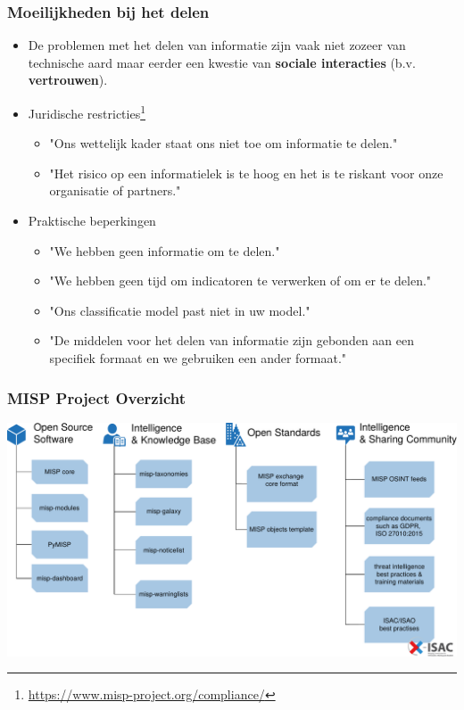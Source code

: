 \begin{frame}
\frametitle{Moeilijkheden bij het delen}
        \begin{itemize}
                \item De problemen met het delen van informatie zijn vaak niet zozeer van technische aard maar eerder een kwestie van {\bf sociale interacties} (b.v. {\bf vertrouwen}).
                \item Juridische restricties\footnote{\url{https://www.misp-project.org/compliance/}}
                        \begin{itemize}
                                \item "Ons wettelijk kader staat ons niet toe om informatie te delen."
                                \item "Het risico op een informatielek is te hoog en het is te riskant voor onze organisatie of partners."
                        \end{itemize}
                \item Praktische beperkingen
                        \begin{itemize}
                                \item "We hebben geen informatie om te delen."
                                \item "We hebben geen tijd om indicatoren te verwerken of om er te delen."
                                \item "Ons classificatie model past niet in uw model."
                                \item "De middelen voor het delen van informatie zijn gebonden aan een specifiek formaat en we gebruiken een ander formaat."
                        \end{itemize}
        \end{itemize}
\end{frame}


\begin{frame}
        \frametitle{MISP Project Overzicht}
        \includegraphics[scale=0.35]{misp-overview-simplified.pdf}
\end{frame}


